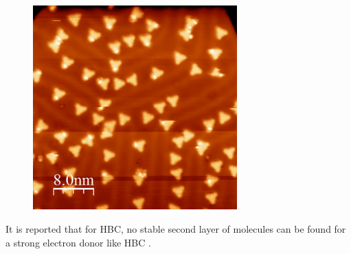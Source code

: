 \begin{figure}[] \centering
	\includegraphics[width=0.7\textwidth]{./images/hbbnc-au-111-rt}
	\caption{}
	\label{}
\end{figure}

It is reported that for HBC, no stable second layer of molecules can be found for a strong electron donor like HBC \cite{de_feyter_two-dimensional_2003}.